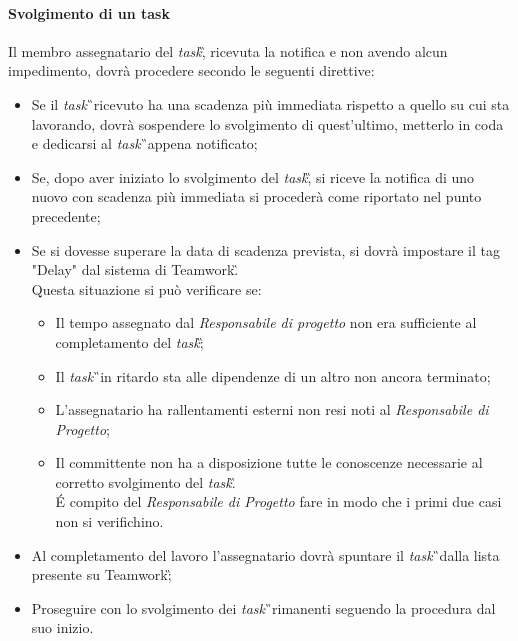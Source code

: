 \paragraph{Svolgimento di un task}
Il membro assegnatario del \textit{task}\G, ricevuta la notifica e non avendo alcun impedimento, dovrà procedere secondo le seguenti direttive:
\begin{itemize}
\item Se il \textit{task}\G\ ricevuto ha una scadenza più immediata rispetto a quello su cui sta lavorando, dovrà sospendere lo svolgimento di quest'ultimo, metterlo in coda e dedicarsi al \textit{task}\G\ appena notificato;
\item Se, dopo aver iniziato lo svolgimento del \textit{task}\G, si riceve la notifica di uno nuovo con scadenza più immediata si procederà come riportato nel punto precedente;
\item Se si dovesse superare la data di scadenza prevista, si dovrà impostare il tag "Delay" dal sistema di Teamwork\G.\\
Questa situazione si può verificare se:
\begin{itemize}
\item Il tempo assegnato dal \textit{Responsabile di progetto} non era sufficiente al completamento del \textit{task}\G;
\item Il \textit{task}\G\ in ritardo sta alle dipendenze di un altro non ancora terminato;
\item L'assegnatario ha rallentamenti esterni non resi noti al \textit{Responsabile di Progetto};
\item Il committente non ha a disposizione tutte le conoscenze necessarie al corretto svolgimento del \textit{task}\G.\\
\'E compito del \textit{Responsabile di Progetto} fare in modo che i primi due casi non si verifichino.
\end{itemize}
\item Al completamento del lavoro l'assegnatario dovrà spuntare il \textit{task}\G\ dalla lista presente su Teamwork\G;
\item Proseguire con lo svolgimento dei \textit{task}\G\ rimanenti seguendo la procedura dal suo inizio.
\end{itemize}

